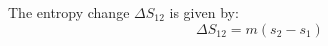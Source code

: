 The entropy change \( \Delta S_{12} \) is given by:  
\[
\Delta S_{12} = m \left(s_2 - s_1\right)
\]